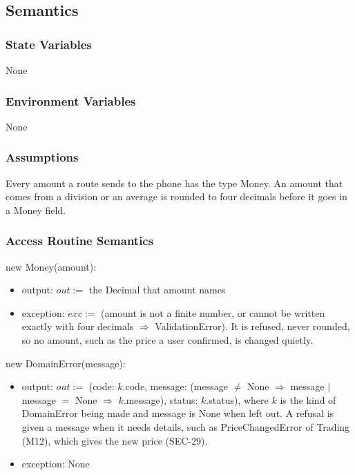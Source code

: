 \documentclass[12pt, titlepage]{article}
\begin{document}
\subsection{Semantics}

\subsubsection{State Variables}

None

\subsubsection{Environment Variables}

None

\subsubsection{Assumptions}

Every amount a route sends to the phone has the type Money. An amount that
comes from a division or an average is rounded to four decimals before it goes
in a Money field.

\subsubsection{Access Routine Semantics}

\noindent new Money(amount):
\begin{itemize}
\item output: $out := $ the Decimal that amount names
\item exception: $exc := $ (amount is not a finite number, or cannot be
  written exactly with four decimals $\Rightarrow$ ValidationError). It is
  refused, never rounded, so no amount, such as the price a user confirmed,
  is changed quietly.
\end{itemize}

\noindent new DomainError(message):
\begin{itemize}
\item output: $out :=$ (code: $k$.code, message: (message $\neq$ None
  $\Rightarrow$ message $|$ message $=$ None $\Rightarrow$ $k$.message),
  status: $k$.status), where $k$ is the kind of DomainError being made and
  message is None when left out. A refusal is given a message when it needs
  details, such as PriceChangedError of Trading (M12), which gives the new
  price (SEC-29).
\item exception: None
\end{itemize}
\end{document}
